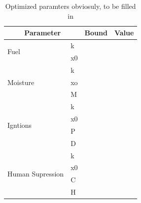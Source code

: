 \begin{table}[]
\centering
\caption{Optimized paramters obviosuly, to be filled in}
\label{tab:optimize}
\begin{tabular}{llll}
\hline
\multicolumn{2}{c}{\textbf{Parameter}} & \multicolumn{1}{c}{\textbf{Bound}} & \multicolumn{1}{c}{\textbf{Value}} \\ \hline
\multirow{2}{*}{Fuel}             & k  &                                    &                                    \\
                                  & x0 &                                    &                                    \\ \hline
\multirow{3}{*}{Moisture}         & k  &                                    &                                    \\
                                  & xo &                                    &                                    \\
                                  & M  &                                    &                                    \\ \hline
\multirow{4}{*}{Igntions}         & k  &                                    &                                    \\
                                  & x0 &                                    &                                    \\
                                  & P  &                                    &                                    \\
                                  & D  &                                    &                                    \\ \hline
\multirow{4}{*}{Human Supression} & k  &                                    &                                    \\
                                  & x0 &                                    &                                    \\
                                  & C  &                                    &                                    \\
                                  & H  &                                    &                                    \\ \hline
\end{tabular}
\end{table}
